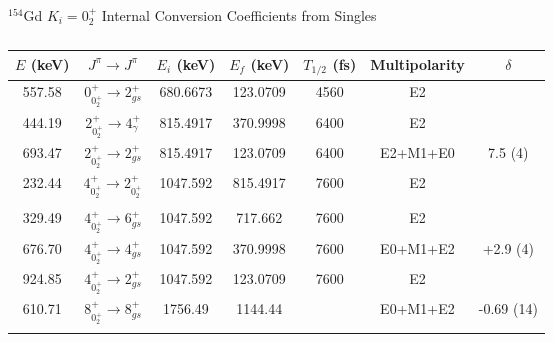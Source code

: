 \begin{table}
    \centering
    \caption{$^{154}$Gd $K_i=0^+_2$ Internal Conversion Coefficients from Singles}
    \label{tab:154Gd_Single_02_Disc}
\begin{ThreePartTable}
    \begin{subtable}{\textwidth}
        \caption{}
    \begin{tabular}{c|c|c|c|c|c|c}
        \toprule
        $E$ (keV)	&	$J^{\pi}	\rightarrow	J^{\pi}$	&	$E_i$ (keV)	&	$E_f$ (keV)	&	$T_{1/2}$ (fs)	&	Multipolarity	&	$\delta$\\
        \hline
        557.58	&	$0^+_{0^+_2}	\rightarrow	2^+_{gs}$	&	680.6673	&	123.0709	&	4560	&	E2	&		\\
        \hline
        444.19	&	$2^+_{0^+_2}	\rightarrow	4^+_{\gamma}$	&	815.4917	&	370.9998	&	6400	&	E2	&		\\
        \hline
        693.47	&	$2^+_{0^+_2}	\rightarrow	2^+_{gs}$	&	815.4917	&	123.0709	&	6400	&	E2+M1+E0	&	7.5 (4)	\\
        \hline
        232.44	&	$4^+_{0^+_2}	\rightarrow	2^+_{0^+_2}$	&	1047.592	&	815.4917	&	7600	&	E2	&	\\
	    &				&		&		&		&		& \\
	    \hline
        329.49	&	$4^+_{0^+_2}	\rightarrow	6^+_{gs}$	&	1047.592	&	717.662	&	7600	&	E2	&	\\
        \hline

        676.70	&	$4^+_{0^+_2}	\rightarrow	4^+_{gs}$	&	1047.592	&	370.9998	&	7600	&	E0+M1+E2	&	+2.9 (4)	\\
        \hline
        924.85	&	$4^+_{0^+_2}	\rightarrow	2^+_{gs}$	&	1047.592	&	123.0709	&	7600	&	E2	&	\\
        \hline        
        610.71	&	$8^+_{0^+_2}	\rightarrow	8^+_{gs}$	&	1756.49	&	1144.44	&		&	E0+M1+E2	&	-0.69 (14)	\\
	    &				&		&		&		&		&	\\
	    \bottomrule
    \end{tabular}
    \end{subtable}
    \end{ThreePartTable}
\end{table}
